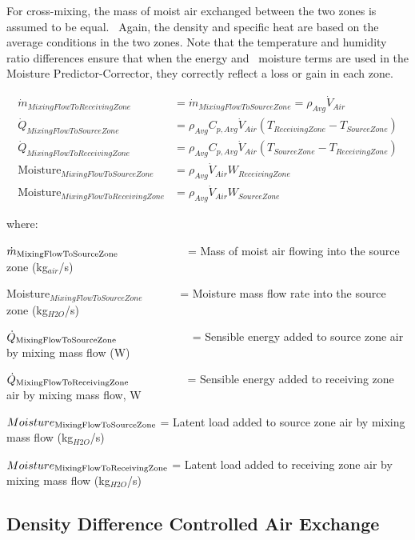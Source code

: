 For cross-mixing, the mass of moist air exchanged between the two zones is assumed to be equal.~ Again, the density and specific heat are based on the average conditions in the two zones. Note that the temperature and humidity ratio differences ensure that when the energy and~ moisture terms are used in the Moisture Predictor-Corrector, they correctly reflect a loss or gain in each zone.

\begin{equation}
  \begin{array}{cl}
    \dot{m}_{MixingFlowToReceivingZone} & = \dot{m}_{MixingFlowToSourceZone} = \rho_{Avg}\dot{V}_{Air} \\
    \dot{Q}_{MixingFlowToSourceZone}    & = \rho_{Avg} C_{p,Avg} \dot{V}_{Air} \left( T_{ReceivingZone}-T_{SourceZone} \right) \\
    \dot{Q}_{MixingFlowToReceivingZone} & = \rho_{Avg} C_{p,Avg} \dot{V}_{Air} \left( T_{SourceZone} - T_{ReceivingZone} \right) \\
    \text{Moisture}_{MixingFlowToSourceZone} & = \rho_{Avg} \dot{V}_{Air} W_{ReceivingZone} \\
    \text{Moisture}_{MixingFlowToReceivingZone} & = \rho_{Avg} \dot{V}_{Air} W_{SourceZone}
  \end{array}
\end{equation}

where:

\({\dot m_{{\rm{MixingFlowToSourceZone}}}}\) ~~~~~~~~~~~ = Mass of moist air flowing into the source zone (kg\(_{air}\)/s)

Moisture\(_{MixingFlowToSourceZone}\)~~~~~~ = Moisture mass flow rate into the source zone (kg\(_{H2O}\)/s)

\({\dot Q_{{\rm{MixingFlowToSourceZone}}}}\) ~~~~~~~~~~~~ = Sensible energy added to source zone air by mixing mass flow (W)

\({\dot Q_{{\rm{MixingFlowToReceivingZone}}}}\) ~~~~~~~~~ = Sensible energy added to receiving zone air by mixing mass flow, W

\(Moistur{e_{{\rm{MixingFlowToSourceZone}}}}\) = Latent load added to source zone air by mixing mass flow (kg\(_{H2O}\)/s)

\(Moistur{e_{{\rm{MixingFlowToReceivingZone}}}}\) = Latent load added to receiving zone air by mixing mass flow (kg\(_{H2O}\)/s)

\subsection{Density Difference Controlled Air Exchange}\label{density-difference-controlled-air-exchange}

